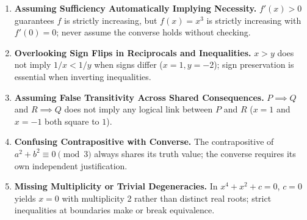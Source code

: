 \documentclass[11pt,a4paper]{article}
\begin{document}
\begin{enumerate}[leftmargin=2em, itemsep=4pt]
  \item \textbf{Assuming Sufficiency Automatically Implying Necessity.}
        $f'(x)>0$ guarantees $f$ is strictly increasing, but $f(x)=x^3$ is strictly increasing with $f'(0)=0$; never assume the converse holds without checking. 
  \item \textbf{Overlooking Sign Flips in Reciprocals and Inequalities.}
        $x > y$ does not imply $1/x < 1/y$ when signs differ ($x=1, y=-2$); sign preservation is essential when inverting inequalities. 
  \item \textbf{Assuming False Transitivity Across Shared Consequences.}
        $P \implies Q$ and $R \implies Q$ does not imply any logical link between $P$ and $R$ ($x=1$ and $x=-1$ both square to $1$). 
  \item \textbf{Confusing Contrapositive with Converse.}
        The contrapositive of $a^2+b^2 \equiv 0 \pmod 3$ always shares its truth value; the converse requires its own independent justification. 
  \item \textbf{Missing Multiplicity or Trivial Degeneracies.}
        In $x^4+x^2+c=0$, $c=0$ yields $x=0$ with multiplicity 2 rather than distinct real roots; strict inequalities at boundaries make or break equivalence. 
\end{enumerate}

\end{document}
